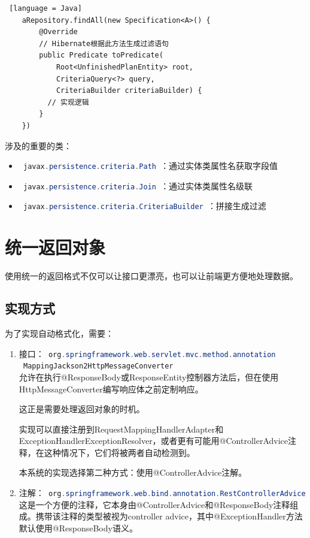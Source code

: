 \begin{enumerate}
\begin{itemize}
                \begin{lstlisting} [language = Java]
    aRepository.findAll(new Specification<A>() {
        @Override
        // Hibernate根据此方法生成过滤语句
        public Predicate toPredicate(
            Root<UnfinishedPlanEntity> root, 
            CriteriaQuery<?> query, 
            CriteriaBuilder criteriaBuilder) {
          // 实现逻辑
        }
    })             
\end{lstlisting}
                涉及的重要的类：
                \begin{itemize}
                  \item \lstinline[language = Java]| javax.persistence.criteria.Path |：通过实体类属性名获取字段值
                  \item \lstinline[language = Java]| javax.persistence.criteria.Join |：通过实体类属性名级联
                  \item \lstinline[language = Java]| javax.persistence.criteria.CriteriaBuilder |：拼接生成过滤
                \end{itemize}
        \end{itemize}
\end{enumerate}

\section{统一返回对象}

使用统一的返回格式不仅可以让接口更漂亮，也可以让前端更方便地处理数据。

\subsection{实现方式}

为了实现自动格式化，需要：
\begin{enumerate}
  \item 接口：\lstinline[language = Java]| org.springframework.web.servlet.mvc.method.annotation |\\\lstinline[language = Java]| MappingJackson2HttpMessageConverter |\\
        允许在执行@ResponseBody或ResponseEntity控制器方法后，但在使用HttpMessageConverter编写响应体之前定制响应。

        这正是需要处理返回对象的时机。

        实现可以直接注册到RequestMappingHandlerAdapter和ExceptionHandlerExceptionResolver，或者更有可能用@ControllerAdvice注释，在这种情况下，它们将被两者自动检测到。

        本系统的实现选择第二种方式：使用@ControllerAdvice注解。
  \item 注解：\lstinline[language = Java]| org.springframework.web.bind.annotation.RestControllerAdvice |\\
        这是一个方便的注释，它本身由@ControllerAdvice和@ResponseBody注释组成。携带该注释的类型被视为controller advice，其中@ExceptionHandler方法默认使用@ResponseBody语义。
\end{enumerate}

